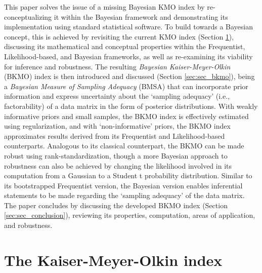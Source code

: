 \documentclass[
  10pt,
  a4paper,
  twoside]{article}
\begin{document}
This paper solves the issue of a missing Bayesian KMO index by re-conceptualizing it within the Bayesian framework and demonstrating its implementation using standard statistical software. To build towards a Bayesian concept, this is achieved by revisiting the current KMO index (Section \ref{sec:sec_kmo}), discussing its mathematical and conceptual properties within the Frequentist, Likelihood-based, and Bayesian frameworks, as well as re-examining its viability for inference and robustness. The resulting \emph{Bayesian Kaiser-Meyer-Olkin} (BKMO) index is then introduced and discussed (Section \ref{sec:sec_bkmo}), being a \emph{Bayesian Measure of Sampling Adequacy} (BMSA) that can incorporate prior information and express uncertainty about the `sampling adequacy' (i.e., factorability) of a data matrix in the form of posterior distributions. With weakly informative priors and small samples, the BKMO index is effectively estimated using regularization, and with `non-informative' priors, the BKMO index approximates results derived from its Frequentist and Likelihood-based counterparts. Analogous to its classical counterpart, the BKMO can be made robust using rank-standardization, though a more Bayesian approach to robustness can also be achieved by changing the likelihood involved in its computation from a Gaussian to a Student t probability distribution. Similar to its bootstrapped Frequentist version, the Bayesian version enables inferential statements to be made regarding the `sampling adequacy' of the data matrix. The paper concludes by discussing the developed BKMO index (Section \ref{sec:sec_conclusion}), reviewing its properties, computation, areas of application, and robustness.

\section{The Kaiser-Meyer-Olkin index}\label{sec:sec_kmo}
\end{document}
